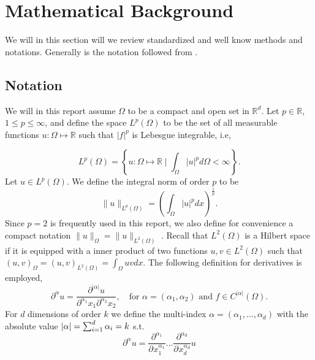 
\section{Mathematical Background}%
\label{sec:mathematical_background}

We will in this section will we review standardized and well know methods and notations. Generally is the notation followed from \cite[Chapter 1]{pietro2012}.


\subsection{Notation}%
\label{sub:notation}

We will in this report assume $\Omega $ to be a compact and open set in $\mathbb{R} ^{d}$. Let $p \in \mathbb{R} $, $ 1 \le  p \le  \infty$, and  define the space $L^{p}\left( \Omega  \right) $ to be the set of all measurable functions $u: \Omega  \mapsto \mathbb{R} $ such that
$\left\lvert f \right\rvert ^{p}$ is Lebesgue integrable, i.e,

\begin{equation*}
    L^{p}\left( \Omega  \right) = \left\{ u: \Omega \mapsto \mathbb{R}  \mid \int_{\Omega }^{} \left\lvert u \right\rvert ^{p} d \Omega  < \infty  \right\}
.\end{equation*}
Let $u \in L^{p}\left( \Omega  \right) $. We define the integral norm of order $p$ to be \[
\| u \|_{ L^{p}\left( \Omega  \right)  }^{  }  = \left( \int_{\Omega }^{} \left\lvert u \right\rvert ^{p} dx  \right) ^{\frac{1}{p}}.
\]
Since $p=2$ is frequently used in this report, we also define for convenience a compact notation $\| u \|_{ \Omega  }^{  }  = \| u \|_{ L^{2}\left( \Omega  \right)  }^{  } $ .  Recall that $L^{2}\left( \Omega  \right) $ is a Hilbert space if it is equipped with a inner
product of two functions $u,v \in L^{2}\left( \Omega  \right) $ such that
    $
\left( u,v \right) _{\Omega } = \left( u,v \right) _{L^2\left( \Omega  \right) } = \int_{\Omega }^{} u  v dx.
$
The following definition for derivatives is employed,
\begin{equation}
\label{eq:mixed_derivative}
\partial ^{\alpha  } u = \frac{\partial ^{\left\lvert \alpha  \right\rvert } u}{ \partial ^{\alpha _{1} } x_{1} \partial ^{\alpha _{2}} x_{2}  }, \quad \text{for } \alpha=\left( \alpha _{1}, \alpha _{2} \right) \text{ and } f \in C^{\left\lvert \alpha  \right\rvert }
\left( \Omega  \right)
.\end{equation}
For $d$ dimensions of order $k$ we define the multi-index $\alpha  = ( \alpha _{1}, \ldots, \alpha _{d})  $ with the absolute value $\left\lvert  \alpha   \right\rvert = \sum_{i=1}^{d}  \alpha _{i} = k $ s.t.
\[
\partial ^{\alpha} u = \frac{\partial ^{ \alpha_{1}  }  } {\partial^{} x_{1}^{\alpha _{1}}  } \ldots \frac{\partial ^{ \alpha_{d}  }  } {\partial^{} x_{d}^{\alpha _{d}}  } u
\]

